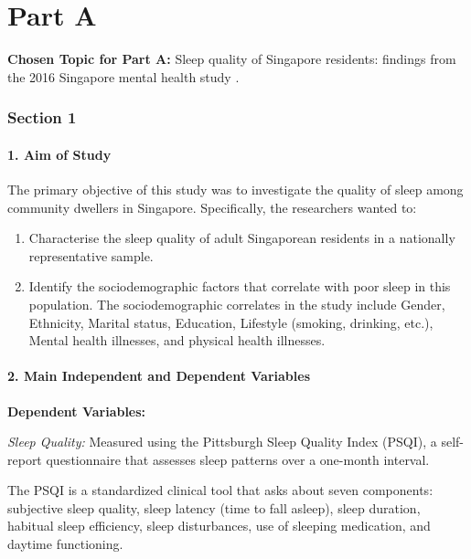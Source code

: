 \part*{Part A}

\noindent\textbf{Chosen Topic for Part A:} Sleep quality of Singapore residents: findings from the 2016 Singapore mental health study \cite{lee2022}.

\section*{Section 1}

\subsection*{1. Aim of Study}

The primary objective of this study was to investigate the quality of sleep among community dwellers in Singapore. Specifically, the researchers wanted to:
\begin{enumerate}
    \item Characterise the sleep quality of adult Singaporean residents in a nationally representative sample.
    \item Identify the sociodemographic factors that correlate with poor sleep in this population. The sociodemographic correlates in the study include Gender, Ethnicity, Marital status, Education, Lifestyle (smoking, drinking, etc.), Mental health illnesses, and physical health illnesses.
\end{enumerate}

\subsection*{2. Main Independent and Dependent Variables}

\noindent\textbf{Dependent Variables:}

\noindent\textit{Sleep Quality:} Measured using the Pittsburgh Sleep Quality Index (PSQI), a self-report questionnaire that assesses sleep patterns over a one-month interval.

The PSQI is a standardized clinical tool that asks about seven components: subjective sleep quality, sleep latency (time to fall asleep), sleep duration, habitual sleep efficiency, sleep disturbances, use of sleeping medication, and daytime functioning.

